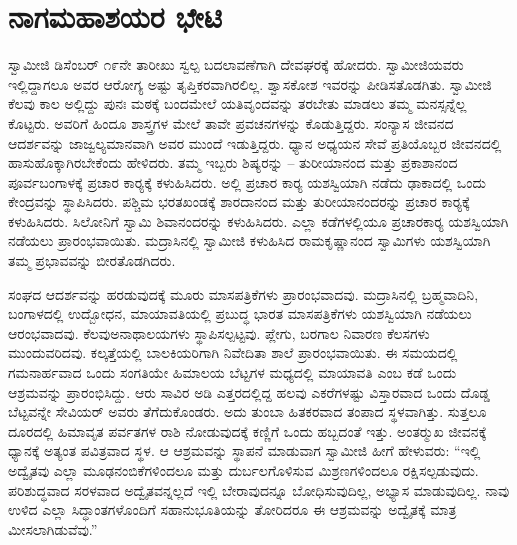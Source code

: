 
\chapter{ನಾಗಮಹಾಶಯರ ಭೇಟಿ }

\vskip 2pt

 ಸ್ವಾಮೀಜಿ ಡಿಸೆಂಬರ್ ೧೯ನೇ ತಾರೀಖು ಸ್ವಲ್ಪ ಬದಲಾವಣೆಗಾಗಿ ದೇವಘರಕ್ಕೆ ಹೋದರು. ಸ್ವಾಮೀಜಿಯವರು ಇಲ್ಲಿದ್ದಾಗಲೂ ಅವರ ಆರೋಗ್ಯ ಅಷ್ಟು ತೃಪ್ತಿಕರವಾಗಿರಲಿಲ್ಲ. ಶ್ವಾಸಕೋಶ ಇವರನ್ನು ಪೀಡಿಸತೊಡಗಿತು. ಸ್ವಾಮೀಜಿ ಕೆಲವು ಕಾಲ ಅಲ್ಲಿದ್ದು ಪುನಃ ಮಠಕ್ಕೆ ಬಂದಮೇಲೆ ಯತಿವೃಂದವನ್ನು ತರಬೇತು ಮಾಡಲು ತಮ್ಮ ಮನಸ್ಸನ್ನೆಲ್ಲ ಕೊಟ್ಟರು. ಅವರಿಗೆ ಹಿಂದೂ ಶಾಸ್ತ್ರಗಳ ಮೇಲೆ ತಾವೇ ಪ್ರವಚನಗಳನ್ನು ಕೊಡುತ್ತಿದ್ದರು. ಸಂನ್ಯಾಸ ಜೀವನದ ಆದರ್ಶವನ್ನು ಜಾಜ್ವಲ್ಯಮಾನವಾಗಿ ಅವರ ಮುಂದೆ ಇಡುತ್ತಿದ್ದರು. ಧ್ಯಾನ ಅಧ್ಯಯನ ಸೇವೆ ಪ್ರತಿಯೊಬ್ಬರ ಜೀವನದಲ್ಲಿ ಹಾಸುಹೊಕ್ಕಾಗಿರಬೇಕೆಂದು ಹೇಳಿದರು. ತಮ್ಮ ಇಬ್ಬರು ಶಿಷ್ಯರನ್ನು – ತುರೀಯಾನಂದ ಮತ್ತು ಪ್ರಕಾಶಾನಂದ ಪೂರ್ವಬಂಗಾಳಕ್ಕೆ ಪ್ರಚಾರ ಕಾರ‍್ಯಕ್ಕೆ ಕಳುಹಿಸಿದರು. ಅಲ್ಲಿ ಪ್ರಚಾರ ಕಾರ‍್ಯ ಯಶಸ್ವಿಯಾಗಿ ನಡೆದು ಢಾಕಾದಲ್ಲಿ ಒಂದು ಕೇಂದ್ರವನ್ನು ಸ್ಥಾಪಿಸಿದರು. ಪಶ್ಚಿಮ ಭರತಖಂಡಕ್ಕೆ ಶಾರದಾನಂದ ಮತ್ತು ತುರೀಯಾನಂದರನ್ನು ಪ್ರಚಾರ ಕಾರ‍್ಯಕ್ಕೆ ಕಳುಹಿಸಿದರು. ಸಿಲೋನಿಗೆ ಸ್ವಾಮಿ ಶಿವಾನಂದರನ್ನು ಕಳುಹಿಸಿದರು. ಎಲ್ಲಾ ಕಡೆಗಳಲ್ಲಿಯೂ ಪ್ರಚಾರಕಾರ‍್ಯ ಯಶಸ್ವಿಯಾಗಿ ನಡೆಯಲು ಪ್ರಾರಂಭವಾಯಿತು. ಮದ್ರಾಸಿನಲ್ಲಿ ಸ್ವಾಮೀಜಿ ಕಳುಹಿಸಿದ ರಾಮಕೃಷ್ಣಾನಂದ ಸ್ವಾಮಿಗಳು ಯಶಸ್ವಿಯಾಗಿ ತಮ್ಮ ಪ್ರಭಾವವನ್ನು ಬೀರತೊಡಗಿದರು. 

\vskip 2pt

 ಸಂಘದ ಆದರ್ಶವನ್ನು ಹರಡುವುದಕ್ಕೆ ಮೂರು ಮಾಸಪತ್ರಿಕೆಗಳು ಪ್ರಾರಂಭವಾದವು. ಮದ್ರಾಸಿನಲ್ಲಿ ಬ್ರಹ್ಮವಾದಿನಿ, ಬಂಗಾಳದಲ್ಲಿ ಉದ್ಬೋಧನ, ಮಾಯಾವತಿಯಲ್ಲಿ ಪ್ರಬುದ್ಧ ಭಾರತ ಮಾಸಪತ್ರಿಕೆಗಳು ಯಶಸ್ವಿಯಾಗಿ ನಡೆಯಲು ಆರಂಭವಾದವು. ಕೆಲವು\break ಅನಾಥಾಲಯಗಳು ಸ್ಥಾಪಿಸಲ್ಪಟ್ಟವು. ಪ್ಲೇಗು, ಬರಗಾಲ ನಿವಾರಣ ಕೆಲಸಗಳು ಮುಂದುವರಿದವು. ಕಲ್ಕತ್ತೆಯಲ್ಲಿ ಬಾಲಕಿಯರಿಗಾಗಿ ನಿವೇದಿತಾ ಶಾಲೆ ಪ್ರಾರಂಭವಾಯಿತು. ಈ ಸಮಯದಲ್ಲಿ ಗಮನಾರ್ಹವಾದ ಒಂದು ಸಂಗತಿಯೇ ಹಿಮಾಲಯ ಬೆಟ್ಟಗಳ ಮಧ್ಯದಲ್ಲಿ ಮಾಯಾವತಿ ಎಂಬ ಕಡೆ ಒಂದು ಆಶ್ರಮವನ್ನು ಪ್ರಾರಂಭಿಸಿದ್ದು. ಆರು ಸಾವಿರ ಅಡಿ ಎತ್ತರದಲ್ಲಿದ್ದ ಹಲವು ಎಕರೆಗಳಷ್ಟು ವಿಸ್ತಾರವಾದ ಒಂದು ದೊಡ್ಡ ಬೆಟ್ಟವನ್ನೇ ಸೇವಿಯರ್ ಅವರು ತೆಗೆದುಕೊಂಡರು. ಅದು ತುಂಬಾ ಹಿತಕರವಾದ ತಂಪಾದ ಸ್ಥಳವಾಗಿತ್ತು. ಸುತ್ತಲೂ ದೂರದಲ್ಲಿ ಹಿಮಾವೃತ ಪರ್ವತಗಳ ರಾಶಿ ನೋಡುವುದಕ್ಕೆ ಕಣ್ಣಿಗೆ ಒಂದು ಹಬ್ಬದಂತೆ ಇತ್ತು. ಅಂತರ‍್ಮುಖ ಜೀವನಕ್ಕೆ ಧ್ಯಾನಕ್ಕೆ ಅತ್ಯಂತ ಪವಿತ್ರವಾದ ಸ್ಥಳ. ಆ ಆಶ್ರಮವನ್ನು ಸ್ಥಾಪನೆ ಮಾಡುವಾಗ ಸ್ವಾಮೀಜಿ ಹೀಗೆ ಹೇಳುವರು: “ಇಲ್ಲಿ ಅದ್ವೈತವು ಎಲ್ಲಾ ಮೂಢನಂಬಿಕೆಗಳಿಂದಲೂ ಮತ್ತು ದುರ್ಬಲಗೊಳಿಸುವ ಮಿಶ್ರಣಗಳಿಂದಲೂ ರಕ್ಷಿಸಲ್ಪಡುವುದು. ಪರಿಶುದ್ಧವಾದ ಸರಳವಾದ ಅದ್ವೈತವನ್ನಲ್ಲದೆ ಇಲ್ಲಿ ಬೇರಾವುದನ್ನೂ ಬೋಧಿಸುವುದಿಲ್ಲ, ಅಭ್ಯಾಸ ಮಾಡುವುದಿಲ್ಲ. ನಾವು ಉಳಿದ ಎಲ್ಲಾ ಸಿದ್ಧಾಂತಗಳೊಂದಿಗೆ ಸಹಾನುಭೂತಿಯನ್ನು ತೋರಿದರೂ ಈ ಆಶ್ರಮವನ್ನು ಅದ್ವೈತಕ್ಕೆ ಮಾತ್ರ ಮೀಸಲಾಗಿಡುವೆವು.” 

\vskip 2pt

